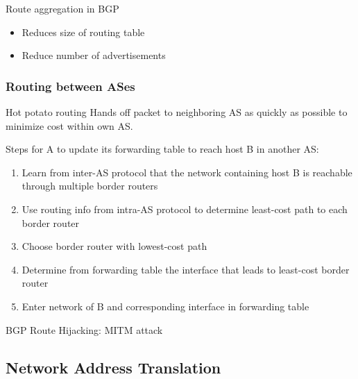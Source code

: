 \begin{theorem}
    {Route aggregation in BGP}

    \begin{itemize}
        \item Reduces size of routing table
        \item Reduce number of advertisements
    \end{itemize}
\end{theorem}

\subsubsection{Routing between ASes}

\begin{theorem}
    {Hot potato routing}
    Hands off packet to neighboring AS as quickly as possible to minimize cost within own AS.

    Steps for A to update its forwarding table to reach host B in another AS:
    \begin{enumerate}
        \item Learn from inter-AS protocol that the network containing host B is reachable through multiple border routers
        \item Use routing info from intra-AS protocol to determine least-cost path to each border router
        \item Choose border router with lowest-cost path
        \item Determine from forwarding table the interface that leads to least-cost border router
        \item Enter network of B and corresponding interface in forwarding table
    \end{enumerate}
\end{theorem}

\begin{knBox}
    {BGP Route Hijacking: MITM attack}
\end{knBox}


\subsection{Network Address Translation}

